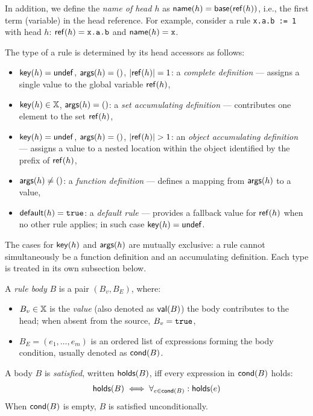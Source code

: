 In addition, we define the \emph{name of head $h$} as $\mathsf{name}(h) = \mathsf{base}(\mathsf{ref}(h))$, i.e., the first term (variable) in the head reference.
For example, consider a rule \texttt{x.a.b := 1} with head $h$: $\mathsf{ref}(h) = \texttt{x.a.b}$ and $\mathsf{name}(h) = \texttt{x}$.

The type of a rule is determined by its head accessors as follows:
\begin{itemize}
  \item $\mathsf{key}(h) = \mathsf{undef}$, $\mathsf{args}(h) = ()$, $|\mathsf{ref}(h)| = 1$:
        a \emph{complete definition} — assigns a single value to the global variable $\mathsf{ref}(h)$,
  \item $\mathsf{key}(h) \in \mathbb{X}$, $\mathsf{args}(h) = ()$:
        a \emph{set accumulating definition} — contributes one element to the set $\mathsf{ref}(h)$,
  \item $\mathsf{key}(h) = \mathsf{undef}$, $\mathsf{args}(h) = ()$, $|\mathsf{ref}(h)| > 1$:
        an \emph{object accumulating definition} — assigns a value to a nested location within the object identified by the prefix of $\mathsf{ref}(h)$,
  \item $\mathsf{args}(h) \neq ()$: a \emph{function definition} — defines a mapping from $\mathsf{args}(h)$ to a value,
  \item $\mathsf{default}(h) = \texttt{true}$: a \emph{default rule} — provides a fallback value for $\mathsf{ref}(h)$ when no other rule applies; in such case $\mathsf{key}(h) = \mathsf{undef}$.
\end{itemize}
The cases for $\mathsf{key}(h)$ and $\mathsf{args}(h)$ are mutually exclusive: a rule cannot simultaneously be a function definition and an accumulating definition.
Each type is treated in its own subsection below.

A \emph{rule body} $B$ is a pair $(B_v, B_E)$, where:
\begin{itemize}
  \item $B_v \in \mathbb{X}$ is the \emph{value} (also denoted as $\mathsf{val}(B)$) the body contributes to the head; when absent from the source, $B_v = \texttt{true}$,
  \item $B_E = (e_1, \ldots, e_m)$ is an ordered list of expressions forming the body condition, usually denoted as $\mathsf{cond}(B)$.
\end{itemize}

A body $B$ is \emph{satisfied}, written $\mathsf{holds}(B)$, iff every expression in $\mathsf{cond}(B)$ holds:
$$\mathsf{holds}(B) \iff \forall_{e \in \mathsf{cond}(B)} : \mathsf{holds}(e)$$
When $\mathsf{cond}(B)$ is empty, $B$ is satisfied unconditionally.

